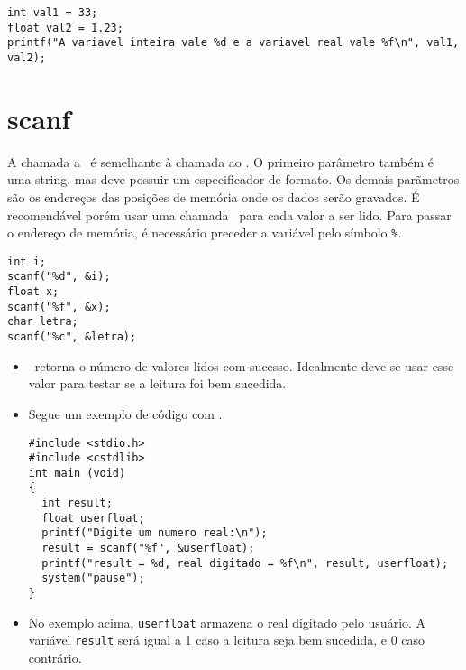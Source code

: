 \begin{lstlisting}
int val1 = 33;
float val2 = 1.23;
printf("A variavel inteira vale %d e a variavel real vale %f\n", val1, val2);
\end{lstlisting}






\section{scanf}
\label{sec:scanf}

A chamada a \SCANF\ é semelhante à chamada ao \PRINTF. O primeiro parâmetro também é uma string, mas deve possuir um especificador de formato. Os demais parãmetros são os endereços das posições de memória onde os dados serão gravados. É recomendável porém usar uma chamada \SCANF\ para cada valor a ser lido. Para passar o endereço de memória, é necessário preceder a variável pelo símbolo {\tt \%}.

\begin{lstlisting}
int i;
scanf("%d", &i);
float x;
scanf("%f", &x);
char letra;
scanf("%c", &letra);
\end{lstlisting}

\begin{itemize}

\item \SCANF\ retorna o número de valores lidos com sucesso. Idealmente deve-se usar esse valor para testar se a leitura foi bem sucedida.

\item Segue um exemplo de código com \SCANF.

\begin{lstlisting}
#include <stdio.h> 
#include <cstdlib> 
int main (void)
{
  int result;
  float userfloat;
  printf("Digite um numero real:\n");
  result = scanf("%f", &userfloat);
  printf("result = %d, real digitado = %f\n", result, userfloat);
  system("pause");
}
\end{lstlisting}

\item No exemplo acima, {\tt userfloat} armazena o real digitado pelo usuário. A variável {\tt result} será igual a 1 caso a leitura seja bem sucedida, e 0 caso contrário.

\end{itemize}


